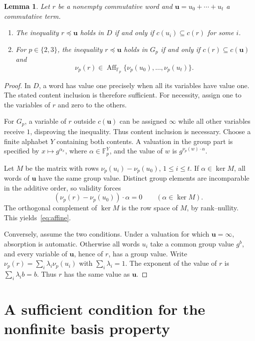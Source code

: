 \documentclass[10pt,a4paper]{amsart}
\newtheorem{lemma}[theorem]{Lemma}
\newcommand{\F}{\mathbb F}
\newcommand{\bu}{\mathbf u}
\DeclareMathOperator{\Aff}{Aff}
\numberwithin{equation}{section}
\begin{document}
\begin{lemma}\label{lem:characterization}
Let $r$ be a nonempty commutative word and
$\bu=u_0+\cdots+u_t$ a commutative term.
\begin{enumerate}
\item The inequality $r\preceq\bu$ holds in $D$ if and only if
$c(u_i)\subseteq c(r)$ for some $i$.
\item For $p\in\{2,3\}$, the inequality $r\preceq\bu$ holds in $G_p$
if and only if $c(r)\subseteq c(\bu)$ and
\begin{equation}\label{eq:affine}
\nu_p(r)\in\Aff_{\F_p}\{\nu_p(u_0),\ldots,\nu_p(u_t)\}.
\end{equation}
\end{enumerate}
\end{lemma}
\begin{proof}
In $D$, a word has value one precisely when all its variables have value
one. The stated content inclusion is therefore sufficient. For necessity,
assign one to the variables of $r$ and zero to the others.

For $G_p$, a variable of $r$ outside $c(\bu)$ can be assigned $\infty$
while all other variables receive $1$, disproving the inequality. Thus
content inclusion is necessary. Choose a finite alphabet $Y$ containing
both contents. A valuation in the group part is specified by
$x\mapsto g^{\alpha_x}$, where $\alpha\in\F_p^Y$, and the value of $w$
is $g^{\nu_p(w)\cdot\alpha}$.

Let $M$ be the matrix with rows $\nu_p(u_i)-\nu_p(u_0)$,
$1\leq i\leq t$. If $\alpha\in\ker M$, all words of $\bu$ have the
same group value. Distinct group elements are incomparable in the additive
order, so validity forces
\[
(\nu_p(r)-\nu_p(u_0))\cdot\alpha=0\qquad(\alpha\in\ker M).
\]
The orthogonal complement of $\ker M$ is the row space of $M$, by
rank--nullity. This yields~\eqref{eq:affine}.

Conversely, assume the two conditions. Under a valuation for which
$\bu=\infty$, absorption is automatic. Otherwise all words $u_i$ take a
common group value $g^b$, and every variable of $\bu$, hence of $r$,
has a group value. Write $\nu_p(r)=\sum_i\lambda_i\nu_p(u_i)$ with
$\sum_i\lambda_i=1$. The exponent of the value of $r$ is
$\sum_i\lambda_i b=b$. Thus $r$ has the same value as $\bu$.
\end{proof}

\section{A sufficient condition for the nonfinite basis property}
\label{sec:criterion}
\end{document}
